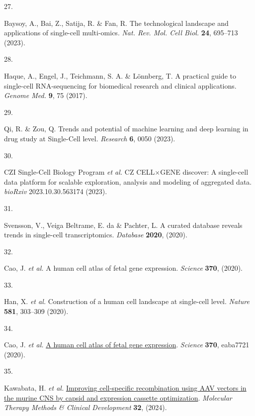 \documentclass[
]{article}
\newlength{\cslhangindent}
\newlength{\csllabelwidth}
\newenvironment{CSLReferences}[2] %
 {\begin{list}{}{%
  \setlength{\itemindent}{0pt}
  \setlength{\leftmargin}{0pt}
  \setlength{\parsep}{0pt}
  \ifodd #1
   \setlength{\leftmargin}{\cslhangindent}
   \setlength{\itemindent}{-1\cslhangindent}
  \fi
  \setlength{\itemsep}{#2\baselineskip}}}
 {\end{list}}
\newcommand{\CSLLeftMargin}[1]{\parbox[t]{\csllabelwidth}{\strut#1\strut}}
\newcommand{\CSLRightInline}[1]{\parbox[t]{\linewidth - \csllabelwidth}{\strut#1\strut}}
\begin{document}
\begin{CSLReferences}{0}{0}
\CSLLeftMargin{27. }%
\CSLRightInline{Baysoy, A., Bai, Z., Satija, R. \& Fan, R. The
technological landscape and applications of single-cell multi-omics.
\emph{Nat. Rev. Mol. Cell Biol.} \textbf{24}, 695--713 (2023).}

\CSLLeftMargin{28. }%
\CSLRightInline{Haque, A., Engel, J., Teichmann, S. A. \& Lönnberg, T. A
practical guide to single-cell {RNA-sequencing} for biomedical research
and clinical applications. \emph{Genome Med.} \textbf{9}, 75 (2017).}

\CSLLeftMargin{29. }%
\CSLRightInline{Qi, R. \& Zou, Q. Trends and potential of machine
learning and deep learning in drug study at {Single-Cell} level.
\emph{Research} \textbf{6}, 0050 (2023).}

\CSLLeftMargin{30. }%
\CSLRightInline{CZI Single-Cell Biology Program \emph{et al.} {CZ}
{CELL\(\times\)GENE} discover: A single-cell data platform for scalable
exploration, analysis and modeling of aggregated data. \emph{bioRxiv}
2023.10.30.563174 (2023).}

\CSLLeftMargin{31. }%
\CSLRightInline{Svensson, V., Veiga Beltrame, E. da \& Pachter, L. A
curated database reveals trends in single-cell transcriptomics.
\emph{Database} \textbf{2020}, (2020).}

\CSLLeftMargin{32. }%
\CSLRightInline{Cao, J. \emph{et al.} A human cell atlas of fetal gene
expression. \emph{Science} \textbf{370}, (2020).}

\CSLLeftMargin{33. }%
\CSLRightInline{Han, X. \emph{et al.} Construction of a human cell
landscape at single-cell level. \emph{Nature} \textbf{581}, 303--309
(2020).}

\CSLLeftMargin{34. }%
\CSLRightInline{Cao, J. \emph{et al.}
\href{https://doi.org/10.1126/science.aba7721}{A human cell atlas of
fetal gene expression}. \emph{Science} \textbf{370}, eaba7721 (2020).}

\CSLLeftMargin{35. }%
\CSLRightInline{Kawabata, H. \emph{et al.}
\href{https://doi.org/10.1016/j.omtm.2024.101185}{Improving
cell-specific recombination using AAV vectors in the murine CNS by
capsid and expression cassette optimization}. \emph{Molecular Therapy
Methods \& Clinical Development} \textbf{32}, (2024).}


\end{CSLReferences}
\end{document}
